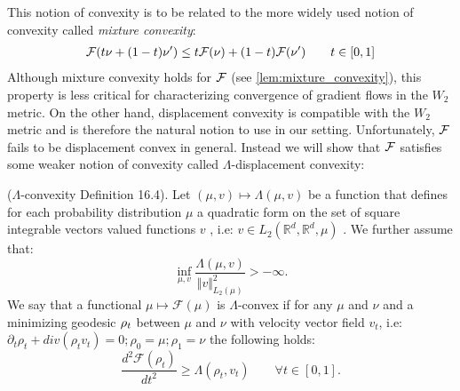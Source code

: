 This notion of convexity is to be related to the more widely used notion of convexity called \textit{mixture convexity}:
\begin{align}
	{{\mathcal F}}(t\nu +(1-t)\nu')\leq t{{\mathcal F}}(\nu)+(1-t){{\mathcal F}}(\nu') \qquad t\in [0,1]
\end{align}
Although mixture convexity holds for ${{\mathcal F}}$ (see \cref{lem:mixture_convexity}), this property is less critical for characterizing convergence of gradient flows in the $W_2$ metric. On the other hand, displacement convexity is compatible with the $W_2$ metric \cite{Bottou:2017} and is therefore the natural notion to use in our setting. Unfortunately, ${{\mathcal F}}$ fails to be displacement convex in general. Instead we will show that ${{\mathcal F}}$ satisfies some weaker notion of convexity called $\Lambda$-displacement convexity:
%
\begin{definition}\label{def:lambda-convexity}
($\Lambda$-convexity \cite{Villani:2009} Definition 16.4). Let $(\mu,v)\mapsto\Lambda(\mu,v)$
be a function that defines for each probability distribution $\mu$
a quadratic form on the set of square integrable vectors valued functions
$v$ , i.e: $v\in L_{2}(\mathbb{R}^{d},\mathbb{R}^{d},\mu)$ . We
further assume that:
\[
\inf_{\mu,v}\frac{\Lambda(\mu,v)}{\Vert v\Vert_{L_{2}(\mu)}^{2}}>-\infty.
\]
We say that a functional $\mu\mapsto\mathcal{F}(\mu)$ is $\Lambda$-convex
if for any $\mu$ and $\nu$ and a minimizing geodesic $\text{\ensuremath{\rho_{t}}}$
between $\mu$ and $\nu$ with velocity vector field $v_{t}$, i.e:
$\partial_{t}\rho_{t}+div(\rho_{t}v_{t})=0;\rho_{0}=\mu;\rho_{1}=\nu$
the following holds:
\begin{equation*}
\frac{d^{2}\mathcal{F}(\rho_{t})}{dt^{2}}\geq\Lambda(\rho_{t},v_{t})\qquad\forall t\in[0,1].
\end{equation*}
\end{definition}

